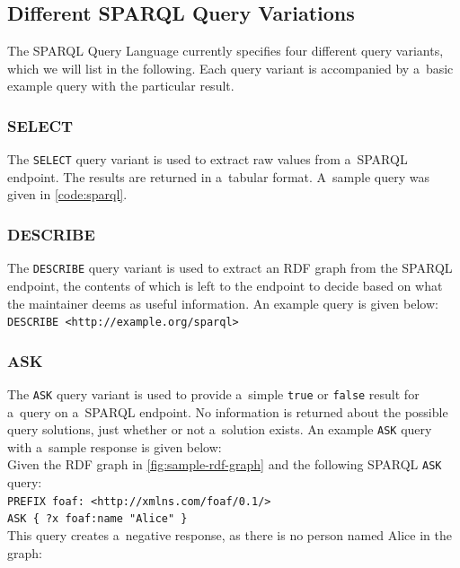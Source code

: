 \subsection{Different SPARQL Query Variations}

The SPARQL Query Language currently specifies four different query variants, which we will list in the following.
Each query variant is accompanied by a~basic example query
with the particular result.

\subsubsection{SELECT}

The \texttt{SELECT} query variant is used to extract
raw values from a~SPARQL endpoint.
The results are returned in a~tabular format.
A~sample query was given in \autoref{code:sparql}.

\subsubsection{DESCRIBE}

The \texttt{DESCRIBE} query variant is used to extract
an RDF graph from the SPARQL endpoint,
the contents of which is left to the endpoint to decide
based on what the maintainer deems as useful information.
An example query is given below:\\

\texttt{DESCRIBE <http://example.org/sparql>}

\subsubsection{ASK}

The \texttt{ASK} query variant is used to provide
a~simple \texttt{true} or \texttt{false} result
for a~query on a~SPARQL endpoint.
No information is returned about the possible query solutions,
just whether or not a~solution exists.
An example \texttt{ASK} query with a~sample response is given below:\\

\noindent Given the RDF graph in \autoref{fig:sample-rdf-graph}
and the following SPARQL \texttt{ASK} query:\\

\texttt{PREFIX foaf: <http://xmlns.com/foaf/0.1/>\\
\indent ASK \{ ?x foaf:name  "Alice" \}}\\

\noindent This query creates a~negative response,
as there is no person named Alice in the graph:\\

